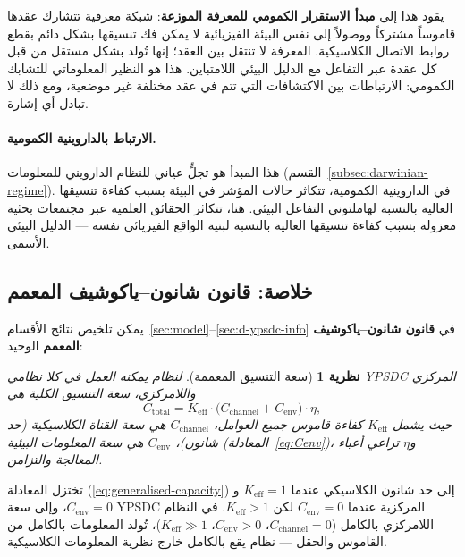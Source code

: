 \documentclass[12pt,a4paper]{article}
\newtheorem{theorem}{نظرية}[section]
\theoremstyle{remark}
\begin{document}
	يقود هذا إلى \textbf{مبدأ الاستقرار الكمومي للمعرفة الموزعة}: شبكة معرفية تتشارك عقدها قاموساً مشتركاً ووصولاً إلى نفس البيئة الفيزيائية لا يمكن فك تنسيقها بشكل دائم بقطع روابط الاتصال الكلاسيكية. المعرفة لا تنتقل بين العقد؛ إنها تُولد بشكل مستقل من قبل كل عقدة عبر التفاعل مع الدليل البيئي اللامتباين. هذا هو النظير المعلوماتي للتشابك الكمومي: الارتباطات بين الاكتشافات التي تتم في عقد مختلفة غير موضعية، ومع ذلك لا تبادل أي إشارة.
	
	\paragraph{الارتباط بالداروينية الكمومية.}
	هذا المبدأ هو تجلٍّ عياني للنظام الدارويني للمعلومات (القسم~\ref{subsec:darwinian-regime}). في الداروينية الكمومية، تتكاثر حالات المؤشر في البيئة بسبب كفاءة تنسيقها العالية بالنسبة لهاملتوني التفاعل البيئي. هنا، تتكاثر الحقائق العلمية عبر مجتمعات بحثية معزولة بسبب كفاءة تنسيقها العالية بالنسبة لبنية الواقع الفيزيائي نفسه — الدليل البيئي الأسمى.
	
	\subsection{خلاصة: قانون شانون–ياكوشيف المعمم}
	\label{subsec:generalised-law}
	
	يمكن تلخيص نتائج الأقسام~\ref{sec:model}--\ref{sec:d-ypsdc-info} في \textbf{قانون شانون–ياكوشيف المعمم} الوحيد:
	
	\begin{theorem}[سعة التنسيق المعممة]
		لنظام يمكنه العمل في كلا نظامي YPSDC المركزي واللامركزي، سعة التنسيق الكلية هي
		\begin{equation}
			\boxed{C_{\mathrm{total}} = K_{\mathrm{eff}} \cdot \bigl(
				C_{\mathrm{channel}} + C_{\mathrm{env}} \bigr) \cdot \eta},
			\label{eq:generalised-capacity}
		\end{equation}
		حيث يشمل \(K_{\mathrm{eff}}\) كفاءة قاموس جميع العوامل، \(C_{\mathrm{channel}}\) هي سعة القناة الكلاسيكية (حد شانون)، \(C_{\mathrm{env}}\) هي سعة المعلومات البيئية (المعادلة~\eqref{eq:Cenv})، و\(\eta\) تراعي أعباء المعالجة والتزامن.
	\end{theorem}
	
	تختزل المعادلة (\ref{eq:generalised-capacity}) إلى حد شانون الكلاسيكي عندما \(K_{\mathrm{eff}}=1\) و\(C_{\mathrm{env}}=0\)، وإلى سعة YPSDC المركزية عندما \(C_{\mathrm{env}}=0\) لكن \(K_{\mathrm{eff}}>1\). في النظام اللامركزي بالكامل (\(C_{\mathrm{channel}}=0\)، \(C_{\mathrm{env}}>0\)، \(K_{\mathrm{eff}}\gg1\))، تُولد المعلومات بالكامل من القاموس والحقل — نظام يقع بالكامل خارج نظرية المعلومات الكلاسيكية.
	
\end{document}
